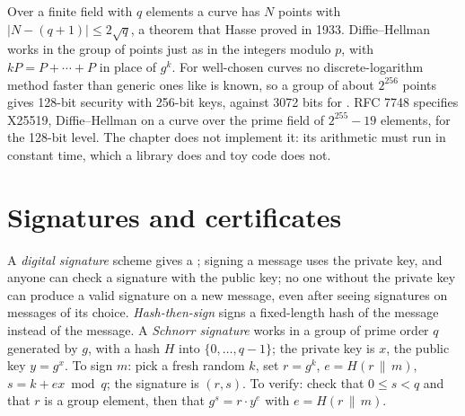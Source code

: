 \label{out:b3:public-key-cryptography:ecadd}

Over a finite field with $q$ elements a curve has $N$ points with $|N - (q + 1)| \le 2\sqrt{q}$, a theorem that Hasse proved in 1933. %
Diffie--Hellman works in the group of points just as in the integers modulo $p$, with $kP = P + \cdots + P$ in place of $g^k$. For well-chosen curves no discrete-logarithm method faster than generic ones like  is known, so a group of about $2^{256}$ points gives 128-bit security with 256-bit keys, against 3072 bits for . %
RFC 7748 specifies X25519, Diffie--Hellman on a curve over the prime field of $2^{255} - 19$ elements, for the 128-bit level. The chapter does not implement it: its arithmetic must run in constant time, which a library does and toy code does not. %

\section{Signatures and certificates}\label{sec:b3:public-key-cryptography:signatures}

\begin{definition}\label{def:b3:public-key-cryptography:signature}
A \emph{digital signature} scheme gives a ; signing a message uses the private key, and anyone can check a signature with the public key; no one without the private key can produce a valid signature on a new message, even after seeing signatures on messages of its choice. \emph{Hash-then-sign} signs a fixed-length hash of the message instead of the message. A \emph{Schnorr signature} works in a group of prime order $q$ generated by $g$, with a hash $H$ into $\{0, \ldots, q - 1\}$; the private key is $x$, the public key $y = g^x$. To sign $m$: pick a fresh random  $k$, set $r = g^k$, $e = H(r \,\|\, m)$, $s = k + ex \bmod q$; the signature is $(r, s)$. To verify: check that $0 \le s < q$ and that $r$ is a group element, then that $g^s = r \cdot y^e$ with $e = H(r \,\|\, m)$.
\end{definition}


